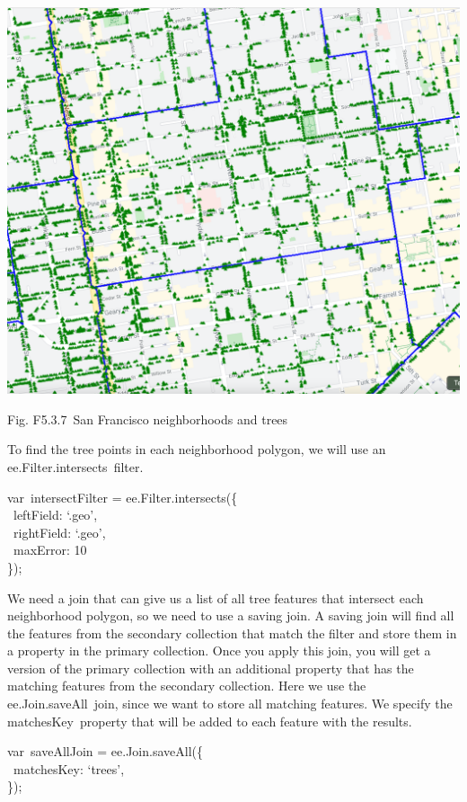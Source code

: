 \documentclass[
  letterpaper,
  DIV=11,
  numbers=noendperiod]{scrreprt}
\begin{document}
\includegraphics{./F5/image35.png}

Fig. F5.3.7~San Francisco neighborhoods and trees

To find the tree points in each neighborhood polygon, we will use an
ee.Filter.intersects~filter.

var~intersectFilter = ee.Filter.intersects(\{\\
\hspace*{0.333em} ~leftField: `.geo',\\
\hspace*{0.333em} ~rightField: `.geo',\\
\hspace*{0.333em} ~maxError: 10\\
\});

We need a join that can give us a list of all tree features that
intersect each neighborhood polygon, so we need to use a saving join. A
saving join will find all the features from the secondary collection
that match the filter and store them in a property in the primary
collection. Once you apply this join, you will get a version of the
primary collection with an additional property that has the matching
features from the secondary collection. Here we use the
ee.Join.saveAll~join, since we want to store all matching features. We
specify the matchesKey~property that will be added to each feature with
the results.

var~saveAllJoin = ee.Join.saveAll(\{\\
\hspace*{0.333em} ~matchesKey: `trees',\\
\});
\end{document}
